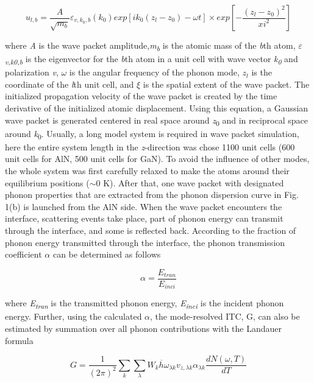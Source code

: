 \documentclass{article}
\begin{document}
\begin{equation}
u_{l,b}=\frac{A}{\sqrt{m_{b}}}\varepsilon_{v,k_{0},b}(k_{0})exp[ik_{0}(z_{l}-z_{0})-\omega t]\times exp[-\frac{(z_{l}-z_{0})^{2}}{xi^{2}}]
\end{equation}

where \textit{A} is the wave packet amplitude,\textit{m\textsubscript{b}} is the atomic mass of the \textit{b}th atom, \textit{$\varepsilon$\textsubscript{v,k0,b}} is the eigenvector for the \textit{b}th atom in a unit cell with wave vector \textit{k\textsubscript{0}} and polarization \textit{v}, \textit{$\omega$} is the angular frequency of the phonon mode, \( z_{l}\) is the coordinate of the \textit{l}th unit cell, and \textit{$\xi$ }is the spatial extent of the wave packet. The initialized propagation velocity of the wave packet is created by the time derivative of the initialized atomic displacement. Using this equation, a Gaussian wave packet is generated centered in real space around \textit{z}\textsubscript{0} and in reciprocal space around \textit{k}\textsubscript{0}. Usually, a long model system is required in wave packet simulation, here the entire system length in the \textit{z}-direction was chose 1100 unit cells (600 unit cells for AlN, 500 unit cells for GaN). To avoid the influence of other modes, the whole system was first carefully relaxed to make the atoms around their equilibrium positions ($\sim$0 K). After that, one wave packet with designated phonon properties that are extracted from the phonon dispersion curve in Fig. 1(b) is launched from the AlN side. When the wave packet encounters the interface, scattering events take place, part of phonon energy can transmit through the interface, and some is reflected back. According to the fraction of phonon energy transmitted through the interface, the phonon transmission coefficient \textit{$\alpha$} can be determined as follows

\begin{equation}
\alpha  =\frac{E_{tran}}{E_{inci}}
\end{equation}

where \textit{E\textsubscript{tran}} is the transmitted phonon energy, \textit{E\textsubscript{inci}\textsubscript{ }}is the incident phonon energy. Further, using the calculated \textit{$\alpha$}, the mode-resolved ITC, G, can also be estimated by summation over all phonon contributions with the Landauer formula \cite{wei2019phonon}

\begin{equation}
G =\frac{1}{(2\pi )^{2}}\sum_{k}^{}\sum_{\lambda }^{}W_{k}\overline{h}\omega_{\lambda k}v_{z,\lambda k}\alpha_{\lambda k}\frac{dN(\omega ,T)}{dT}
\end{equation}
\end{document}

